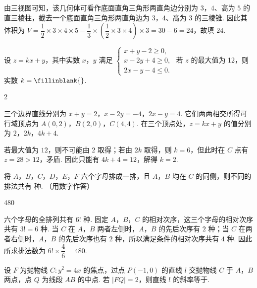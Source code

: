 \begin{solution}
由三视图可知，该几何体可看作底面直角三角形两直角边分别为 \(3\)，\(4\)、高为 \(5\) 的直三棱柱，截去一个底面直角三角形两直角边为 \(3\)，\(4\)、高为 \(3\) 的三棱锥. 因此其体积为
\(V=\dfrac{1}{2}\times3\times4\times5-\dfrac{1}{3}\times\left(\dfrac{1}{2}\times3\times4\right)\times3=30-6=24\)，故填 \(24\).
\end{solution}

\begin{problem}
设 \(z = kx + y\)，其中实数 \(x\)，\(y\) 满足 \(\begin{cases}
x + y - 2 \geqslant 0,\\
x - 2y + 4 \geqslant 0,\\
2x - y - 4 \leqslant 0.
\end{cases}\) 若 \(z\) 的最大值为 12，则实数 \(k =\fillinblank{}\).
\end{problem}

\begin{answer}
2
\end{answer}

\begin{solution}
三个边界直线分别为 \(x+y=2\)，\(x-2y=-4\)，\(2x-y=4\). 它们两两相交所得可行域顶点为 \(A(0,2)\)，\(B(2,0)\)，\(C(4,4)\). 在三个顶点处，\(z=kx+y\) 的值分别为 \(2\)，\(2k\)，\(4k+4\).

若最大值为 \(12\)，则不可能由 \(2\) 取得；若由 \(2k\) 取得，则 \(k=6\)，但此时在 \(C\) 点有 \(z=28>12\)，矛盾. 因此只能有 \(4k+4=12\)，解得 \(k=2\).
\end{solution}

\begin{problem}
将 \(A\)，\(B\)，\(C\)，\(D\)，\(E\)，\(F\) 六个字母排成一排，且 \(A\)，\(B\) 均在 \(C\) 的同侧，则不同的排法共有\fillinblank{} 种. （用数字作答）
\end{problem}

\begin{answer}
480
\end{answer}

\begin{solution}
六个字母的全排列共有 \(6!\) 种. 固定 \(A\)，\(B\)，\(C\) 的相对次序，这三个字母的相对次序共有 \(3!=6\) 种. 当 \(C\) 在 \(A\)，\(B\) 两者左侧时，\(A\)，\(B\) 的先后次序有 \(2\) 种；当 \(C\) 在两者右侧时，\(A\)，\(B\) 的先后次序也有 \(2\) 种，所以满足条件的相对次序共有 \(4\) 种. 因此所求排法数为 \(6!\times\dfrac{4}{6}=480\).
\end{solution}

\begin{problem}
设 \(F\) 为抛物线 \(C: y^{2} = 4x\) 的焦点，过点 \(P(-1,0)\) 的直线 \(l\) 交抛物线 \(C\) 于 \(A\)，\(B\) 两点，点 \(Q\) 为线段 \(AB\) 的中点. 若 \(|FQ| = 2\)，则直线 \(l\) 的斜率等于\fillinblank{}.
\end{problem}

